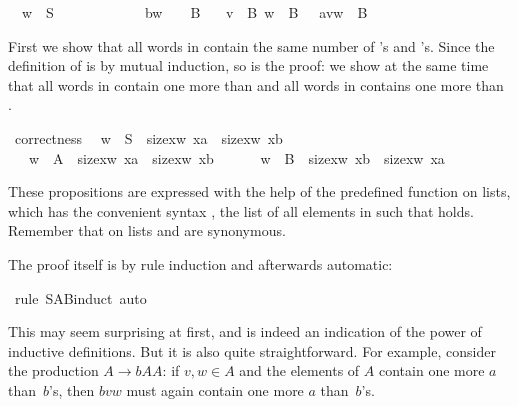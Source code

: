 \begin{isabellebody}
\isanewline
\ \ {\isachardoublequote}w\ {\isasymin}\ S\ \ \ \ \ \ \ \ \ \ \ \ {\isasymLongrightarrow}\ b{\isacharhash}w\ \ \ {\isasymin}\ B{\isachardoublequote}\isanewline
\ \ {\isachardoublequote}{\isasymlbrakk}\ v\ {\isasymin}\ B{\isacharsemicolon}\ w\ {\isasymin}\ B\ {\isasymrbrakk}\ {\isasymLongrightarrow}\ a{\isacharhash}v{\isacharat}w\ {\isasymin}\ B{\isachardoublequote}\isamarkupfalse%
%
\begin{isamarkuptext}%
\noindent
First we show that all words in  contain the same number of 's and 's. Since the definition of  is by mutual
induction, so is the proof: we show at the same time that all words in
 contain one more  than  and all words in  contains one more  than .%
\end{isamarkuptext}%
\isamarkuptrue%
\ correctness{\isacharcolon}\isanewline
\ \ {\isachardoublequote}{\isacharparenleft}w\ {\isasymin}\ S\ {\isasymlongrightarrow}\ size{\isacharbrackleft}x{\isasymin}w{\isachardot}\ x{\isacharequal}a{\isacharbrackright}\ {\isacharequal}\ size{\isacharbrackleft}x{\isasymin}w{\isachardot}\ x{\isacharequal}b{\isacharbrackright}{\isacharparenright}\ \ \ \ \ {\isasymand}\isanewline
\ \ \ {\isacharparenleft}w\ {\isasymin}\ A\ {\isasymlongrightarrow}\ size{\isacharbrackleft}x{\isasymin}w{\isachardot}\ x{\isacharequal}a{\isacharbrackright}\ {\isacharequal}\ size{\isacharbrackleft}x{\isasymin}w{\isachardot}\ x{\isacharequal}b{\isacharbrackright}\ {\isacharplus}\ {}{\isacharparenright}\ {\isasymand}\isanewline
\ \ \ {\isacharparenleft}w\ {\isasymin}\ B\ {\isasymlongrightarrow}\ size{\isacharbrackleft}x{\isasymin}w{\isachardot}\ x{\isacharequal}b{\isacharbrackright}\ {\isacharequal}\ size{\isacharbrackleft}x{\isasymin}w{\isachardot}\ x{\isacharequal}a{\isacharbrackright}\ {\isacharplus}\ {}{\isacharparenright}{\isachardoublequote}\isamarkupfalse%
%
\begin{isamarkuptxt}%
\noindent
These propositions are expressed with the help of the predefined  function on lists, which has the convenient syntax , the list of all elements  in  such that 
holds. Remember that on lists  and  are synonymous.

The proof itself is by rule induction and afterwards automatic:%
\end{isamarkuptxt}%
\isamarkuptrue%
\ {\isacharparenleft}rule\ S{\isacharunderscore}A{\isacharunderscore}B{\isachardot}induct{\isacharcomma}\ auto{\isacharparenright}\isamarkupfalse%
%
\begin{isamarkuptext}%
\noindent
This may seem surprising at first, and is indeed an indication of the power
of inductive definitions. But it is also quite straightforward. For example,
consider the production $A \to b A A$: if $v,w \in A$ and the elements of $A$
contain one more $a$ than~$b$'s, then $bvw$ must again contain one more $a$
than~$b$'s.


\end{isamarkuptext}
\end{isabellebody}
